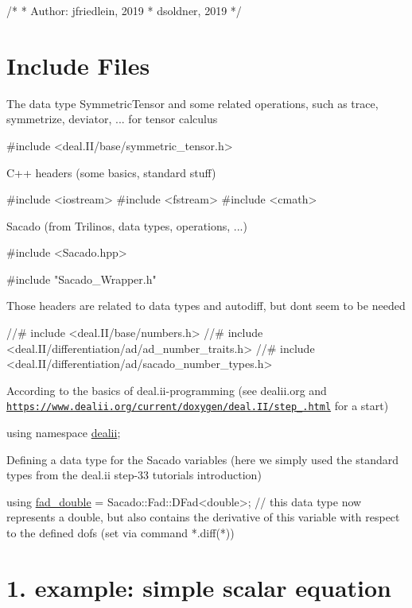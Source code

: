 \begin{DoxyCode}
\textcolor{comment}{/*}
\textcolor{comment}{ * Author: jfriedlein, 2019}
\textcolor{comment}{ *      dsoldner, 2019}
\textcolor{comment}{ */}
\end{DoxyCode}
 \hypertarget{index_includes}{}\section{Include Files}\label{index_includes}
The data type Symmetric\+Tensor and some related operations, such as trace, symmetrize, deviator, ... for tensor calculus 
\begin{DoxyCode}
\textcolor{preprocessor}{#include <deal.II/base/symmetric\_tensor.h>}
\end{DoxyCode}
 C++ headers (some basics, standard stuff) 
\begin{DoxyCode}
\textcolor{preprocessor}{#include <iostream>}
\textcolor{preprocessor}{#include <fstream>}
\textcolor{preprocessor}{#include <cmath>}
\end{DoxyCode}
 Sacado (from Trilinos, data types, operations, ...) 
\begin{DoxyCode}
\textcolor{preprocessor}{#include <Sacado.hpp>}
 
\textcolor{preprocessor}{#include "Sacado\_Wrapper.h"}
\end{DoxyCode}
 Those headers are related to data types and autodiff, but don\textquotesingle{}t seem to be needed 
\begin{DoxyCode}
\textcolor{comment}{//#  include <deal.II/base/numbers.h>}
\textcolor{comment}{//#  include <deal.II/differentiation/ad/ad\_number\_traits.h>}
\textcolor{comment}{//#  include <deal.II/differentiation/ad/sacado\_number\_types.h>}
\end{DoxyCode}
 According to the basics of deal.\+ii-\/programming (see dealii.\+org and \href{https://www.dealii.org/current/doxygen/deal.II/step_1.html}{\tt https\+://www.\+dealii.\+org/current/doxygen/deal.\+I\+I/step\+\_.\+html} for a start) 
\begin{DoxyCode}
\textcolor{keyword}{using namespace }\hyperlink{namespacedealii}{dealii};
\end{DoxyCode}
 Defining a data type for the Sacado variables (here we simply used the standard types from the deal.\+ii step-\/33 tutorial\textquotesingle{}s introduction) 
\begin{DoxyCode}
\textcolor{keyword}{using} \hyperlink{example__code__to__be__documented_8cc_a868b94676739e612d9c95940e70892a9}{fad\_double} = Sacado::Fad::DFad<double>;   \textcolor{comment}{// this data type now represents a double, but
       also contains the derivative of this variable with respect to the defined dofs (set via command *.diff(*))}
\end{DoxyCode}
 \hypertarget{index_Ex1}{}\section{1. example\+: simple scalar equation}\label{index_Ex1}

